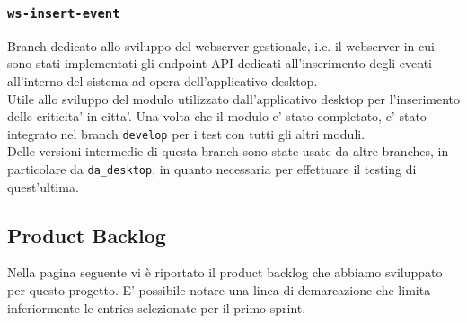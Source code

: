 \documentclass{article}
\begin{document}
\subsubsection{\texttt{ws-insert-event}}

Branch dedicato allo sviluppo del webserver gestionale, i.e. il webserver in cui sono stati implementati gli endpoint API dedicati all'inserimento degli eventi all'interno del sistema ad opera dell'applicativo desktop. \\
Utile allo sviluppo del modulo utilizzato dall'applicativo desktop per l'inserimento delle criticita' in citta'.
Una volta che il modulo e' stato completato, e' stato integrato nel branch \texttt{develop} per i test con tutti gli altri moduli.\\
Delle versioni intermedie di questa branch sono state usate da altre branches, in particolare da \texttt{da\_desktop}, in quanto necessaria per effettuare il testing di quest'ultima.

\clearpage

\subsection{Product Backlog}
Nella pagina seguente vi è riportato il product backlog che abbiamo sviluppato per questo progetto. E' possibile notare una linea di demarcazione che limita inferiormente le entries selezionate per il primo sprint.
\end{document}
